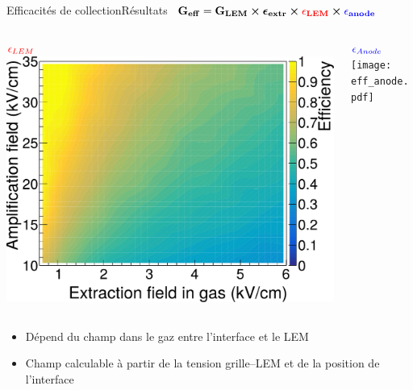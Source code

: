     \begin{frame}{Efficacités de collection}{Résultats}
        \hbox{
        		$\mathbf{G_{eff}=G_{LEM}\boldsymbol{\times}\boldsymbol{\epsilon}_{extr} \boldsymbol{\times}\textcolor{red}{\epsilon_{LEM}}\boldsymbol{\times} \textcolor{blue}{\epsilon_{anode}}}$
        	}\vspace{0.2cm}
      		\begin{columns}
            \begin{column}{0.5\textwidth}
                \centering $\textcolor{red}{\epsilon_{LEM}}$
                \includegraphics[width=\textwidth]{./pictures/eff_lem_alone.pdf}
            \end{column}\hfill
            \begin{column}{0.5\textwidth}
                \centering $\textcolor{blue}{\epsilon_{Anode}}$
                \texttt{[image: eff\_anode.pdf]}
            \end{column}
        \end{columns}
      		\begin{columns}
            \begin{column}{0.5\textwidth}
                \begin{scriptsize}
                    \begin{itemize}
                        \item Dépend du champ dans le gaz entre l'interface et le LEM
                        \item Champ calculable à partir de la tension grille--LEM et de la position de l'interface
                    \end{itemize}

\end{scriptsize}
\end{column}
\end{columns}
\end{frame}
